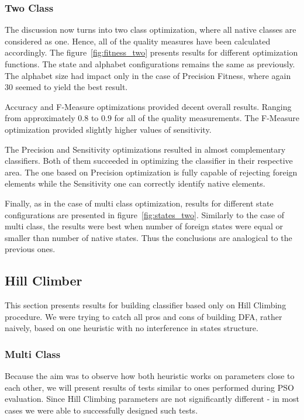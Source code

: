 \documentclass{mini}
\begin{document}
\subsubsection{Two Class} \label{subsec:pso_two_class}

The discussion now turns into two class optimization, where all native classes are considered as one. Hence, all of the quality measures have been calculated accordingly.
The figure~\ref{fig:fitness_two} presents results for different optimization functions. The state and alphabet configurations remains the same as previously. The alphabet size had impact only in the case of Precision Fitness, where again $30$ seemed to yield the best result.

Accuracy and F-Measure optimizations provided decent overall results. Ranging from approximately $0.8$ to $0.9$ for all of the quality measurements. The F-Measure optimization provided slightly higher values of sensitivity.

The Precision and Sensitivity optimizations resulted in almost complementary classifiers. Both of them succeeded in optimizing the classifier in their respective area. The one based on Precision optimization is fully capable of rejecting foreign elements while the Sensitivity one can correctly identify native elements.


Finally, as in the case of multi class optimization, results for different state configurations are presented in figure~\ref{fig:states_two}. Similarly to the case of multi class, the results were best when number of foreign states were equal or smaller than number of native states. Thus the conclusions are analogical to the previous ones.

\makeFigureFitnessTwo
\makeFigureStatesTwo


\pagebreak
%
%
\subsection{Hill Climber}
This section presents results for building classifier based only on Hill Climbing procedure. We were trying to catch all pros and cons of building DFA, rather naively, based on one heuristic with no interference in states structure. 

\subsubsection{Multi Class} \label{subsec:multi_class_hc}
Because the aim was to observe how both heuristic works on parameters close to each other, we will present results of tests similar to ones performed during PSO evaluation. Since Hill Climbing parameters are not significantly different - in most cases we were able to successfully designed such tests.
\end{document}
